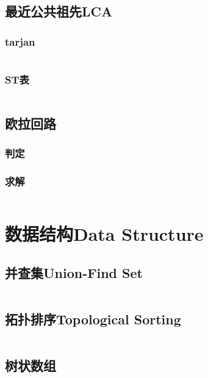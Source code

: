 \documentclass[twoside,sub3section,UTF8]{ctexart}						%
\begin{document}
	\subsection{最近公共祖先LCA}
		\subsubsection{tarjan}
			\inputminted{c++}{"Gragh Theory/LeastCommonAncestors/tarjan.cpp"}
		\subsubsection{ST表}
			\inputminted{c++}{"Gragh Theory/LeastCommonAncestors/dfs+ST.cpp"}

	\subsection{欧拉回路}
		\subsubsection{判定}
		\subsubsection{求解}
			\inputminted{c++}{"Gragh Theory/EulerRoad/construction.cpp"}



\newpage
\section{数据结构Data Structure}
	\subsection{并查集Union-Find Set}
		\inputminted{c++}{"Data Structure/union-find-set.cpp"}
	\subsection{拓扑排序Topological Sorting}
		\inputminted{c++}{"Data Structure/topo.cpp"}
	\subsection{树状数组}
		\inputminted{c++}{"Data Structure/BinaryIndexedTree.cpp"}
\end{document}
